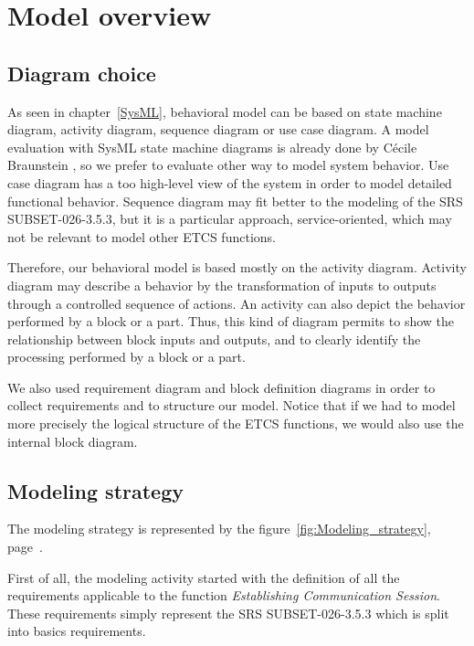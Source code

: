 \documentclass{template/openetcs_report}
\newcommand\refFigure[1]{figure~\ref{#1}, page~\pageref{#1}}
\newcommand\refChapter[1]{chapter~\ref{#1}}
\begin{document}
\chapter{Model overview}


\section{Diagram choice}

As seen in \refChapter{SysML}, behavioral model can be based on state machine diagram, activity diagram, sequence diagram or use case diagram. A model evaluation with SysML state machine diagrams is already done by Cécile Braunstein \cite{Braunstein_SysML_Model}, so we prefer to evaluate other way to model system behavior. Use case diagram has a too high-level view of the system in order to model detailed functional behavior. Sequence diagram may fit better to the modeling of the SRS SUBSET-026-3.5.3, but it is a particular approach, service-oriented, which may not be relevant to model other ETCS functions.

Therefore, our behavioral model is based mostly on the activity diagram. Activity diagram may describe a behavior by the transformation of inputs to outputs through a controlled sequence of actions. An activity can also depict the behavior performed by a block or a part. Thus, this kind of diagram permits to show the relationship between block inputs and outputs, and to clearly identify the processing performed by a block or a part.

We also used requirement diagram and block definition diagrams in order to collect requirements and to structure our model. Notice that if we had to model more precisely the logical structure of the ETCS functions, we would also use the internal block diagram.

\section{Modeling strategy} \label{Modeling_strategy}

The modeling strategy is represented by the \refFigure{fig:Modeling_strategy}.

First of all, the modeling activity started with the definition of all the requirements applicable to the function \textsl{Establishing Communication Session}. These requirements simply represent the SRS SUBSET-026-3.5.3 \cite{SRS} which is split into basics requirements.
\end{document}
